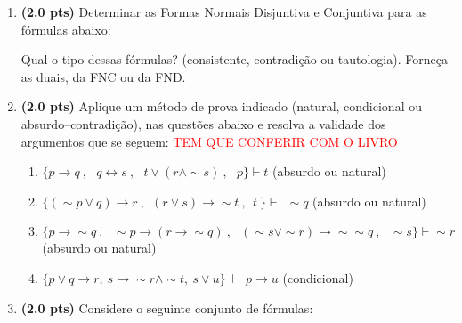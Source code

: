 \documentclass[11pt, a4paper,final]{article}
\begin{document}
\begin{enumerate}

\item {\bf (2.0 pts)} Determinar as Formas Normais Disjuntiva e Conjuntiva para as fórmulas abaixo:

Qual o tipo dessas fórmulas? (consistente, contradição ou tautologia). Forneça as duais, da FNC ou  da FND.


\item {\bf (2.0 pts)} Aplique um método de prova indicado (natural, condicional ou absurdo--contradição), nas questões abaixo e resolva a validade dos argumentos que se seguem: 
\textcolor{red}{TEM QUE CONFERIR COM O LIVRO}

\begin{enumerate}
\item $\{p\rightarrow  q \: , \:\:\: q \leftrightarrow s \: , \:\:\:
 t \vee ( r \wedge \sim s)\: , \:\:\: p \} \vdash  t $ \hskip 1cm (absurdo ou natural)
 
\item  $\{ ( \sim p \vee q) \rightarrow r \: ,
  \:\: (r \vee s)  \rightarrow \sim t \: ,
    \:\: t \:   \} \vdash \: \:  \sim  q $ \hskip 1cm (absurdo ou natural)

\item $\{p\rightarrow \sim q \: , \:\:\: \sim p \rightarrow (r \rightarrow \sim q)  \: , \:\:\: (\sim s \vee \sim r)\rightarrow \sim \sim q  \: , \:\:\: \sim s  \} \vdash  \sim r $ \hskip 1cm (absurdo ou natural)

\item $ \{ p \vee q \rightarrow r,~ s \rightarrow \sim r \wedge \sim t,~ s \vee u \} ~\vdash~ p \rightarrow u $ \hskip 1cm (condicional)
\end{enumerate}



\item {\bf (2.0 pts)} Considere o seguinte conjunto de fórmulas: 


\end{enumerate}
\end{document}
